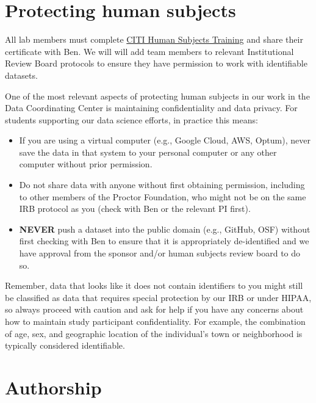 \documentclass[]{book}
\providecommand{\tightlist}{%
  \setlength{\itemsep}{0pt}\setlength{\parskip}{0pt}}
\begin{document}
\hypertarget{protecting-human-subjects}{%
\section{Protecting human subjects}\label{protecting-human-subjects}}

All lab members must complete \href{https://irb.ucsf.edu/citi-human-subjects-training}{CITI Human Subjects Training} and share their certificate with Ben. We will will add team members to relevant Institutional Review Board protocols to ensure they have permission to work with identifiable datasets.

One of the most relevant aspects of protecting human subjects in our work in the Data Coordinating Center is maintaining confidentiality and data privacy. For students supporting our data science efforts, in practice this means:

\begin{itemize}
\tightlist
\item
  If you are using a virtual computer (e.g., Google Cloud, AWS, Optum), never save the data in that system to your personal computer or any other computer without prior permission.
\item
  Do not share data with anyone without first obtaining permission, including to other members of the Proctor Foundation, who might not be on the same IRB protocol as you (check with Ben or the relevant PI first).
\item
  \textbf{NEVER} push a dataset into the public domain (e.g., GitHub, OSF) without first checking with Ben to ensure that it is appropriately de-identified and we have approval from the sponsor and/or human subjects review board to do so.
\end{itemize}

Remember, data that looks like it does not contain identifiers to you might still be classified as data that requires special protection by our IRB or under HIPAA, so always proceed with caution and ask for help if you have any concerns about how to maintain study participant confidentiality. For example, the combination of age, sex, and geographic location of the individual's town or neighborhood is typically considered identifiable.

\hypertarget{authorship}{%
\section{Authorship}\label{authorship}}
\end{document}

